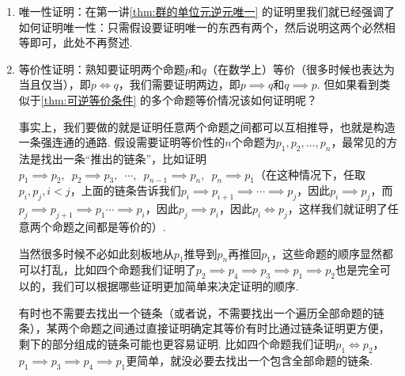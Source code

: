 \begin{enumerate}
\begin{theorem}{}{}
\begin{enumerate}
                  \item $\overline{a}=\overline{b}$.
              \end{enumerate}
          \end{theorem}
          \begin{proof}
              假设$\overline{a}\cap\overline{b}\neq\varnothing$，则存在$x\in\overline{a}\cap\overline{b}$，即$x\,R\,a$且$x\,R\,b$，因此由对称性有$a\,R\,x$，因此由传递性有$aRb$，因此根据等价类的定义可知，二者等价类必然相等，即$\overline{a}=\overline{b}$.
          \end{proof}

          事实上，上面用到的证明思想也涉及了排中律（即$p\lor\lnot p$为真）. 因为证明若$p$成立，则$q$和$r$都成立. 那么我们的思想是，要么$q$成立，得证，要么$\lnot q$成立，然后得出$\lnot q\to r$成立，根据蕴含的真值表知此时$r$必然成立，得证. 显然这一过程需要基于要么$q$成立，要么$\lnot q$成立这一排中律.

    \item 唯一性证明：在第一讲\autoref{thm:群的单位元逆元唯一} 的证明里我们就已经强调了如何证明唯一性：只需假设要证明唯一的东西有两个，然后说明这两个必然相等即可，此处不再赘述.

    \item 等价性证明：熟知要证明两个命题$p$和$q$（在数学上）等价（很多时候也表达为当且仅当），即$p\iff q$，我们需要证明两边，即$p\implies q$和$q\implies p$. 但如果看到类似于\autoref{thm:可逆等价条件} 的多个命题等价情况该如何证明呢？

          事实上，我们要做的就是证明任意两个命题之间都可以互相推导，也就是构造一条强连通的通路. 假设需要证明等价性的$n$个命题为$p_1,p_2,\ldots,p_n$，最常见的方法是找出一条``推出的链条''，比如证明$p_1\implies p_2,\enspace p_2\implies p_3,\enspace \cdots,\enspace p_{n-1}\implies p_n,\enspace p_n\implies p_1$（在这种情况下，任取$p_i, p_j, i<j$，上面的链条告诉我们$p_i\implies p_{i+1}\implies\cdots\implies p_j$，因此$p_i\implies p_j$，而$p_j\implies p_{j+1}\implies p_1\cdots\implies p_i$，因此$p_j\implies p_i$，因此$p_i\iff p_j$，这样我们就证明了任意两个命题之间都是等价的）.

          当然很多时候不必如此刻板地从$p_1$推导到$p_n$再推回$p_1$，这些命题的顺序显然都可以打乱，比如四个命题我们证明了$p_2\implies p_4\implies p_3\implies p_1 \implies p_2$也是完全可以的，我们可以根据哪些证明更加简单来决定证明的顺序.

          有时也不需要去找出一个链条（或者说，不需要找出一个遍历全部命题的链条），某两个命题之间通过直接证明确定其等价有时比通过链条证明更方便，剩下的部分组成的链条可能也更容易证明. 比如四个命题我们证明$p_1\iff p_2$，$p_1 \implies p_3 \implies p_4 \implies p_1$更简单，就没必要去找出一个包含全部命题的链条.


\end{enumerate}
